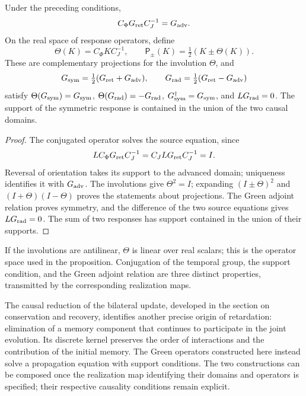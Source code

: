 \begin{proposition}
\label{vii:prop:green-paridades}
Under the preceding conditions,
\[
 C_\Phi G_{\rm ret}C_J^{-1}=G_{\rm adv}.
\]
On the real space of response operators, define
\[
 \Theta(K)=C_\Phi K C_J^{-1},\qquad
 \mathsf P_\pm(K)=\tfrac12(K\pm\Theta(K)).
\]
These are complementary projections for the involution \(\Theta\), and
\begin{equation}
 G_{\rm sym}=\tfrac12(G_{\rm ret}+G_{\rm adv}),\qquad
 G_{\rm rad}=\tfrac12(G_{\rm ret}-G_{\rm adv})
 \label{vii:eq:descomposicion-green}
\end{equation}
satisfy \(\Theta(G_{\rm sym})=G_{\rm sym}\),
\(\Theta(G_{\rm rad})=-G_{\rm rad}\),
\(G_{\rm sym}^{\dagger}=G_{\rm sym}\), and
\(LG_{\rm rad}=0\). The support of the symmetric response is contained
in the union of the two causal domains.
\end{proposition}
\begin{proof}
The conjugated operator solves the source equation, since
\[
 LC_\Phi G_{\rm ret}C_J^{-1}=C_JLG_{\rm ret}C_J^{-1}=I.
\]
Reversal of orientation takes its support to the advanced domain;
uniqueness identifies it with \(G_{\rm adv}\). The involutions give
\(\Theta^2=I\); expanding \((I\pm\Theta)^2\) and
\((I+\Theta)(I-\Theta)\) proves the statements about projections.
The Green adjoint relation proves symmetry, and the difference of the two
source equations gives \(LG_{\rm rad}=0\). The sum of two responses
has support contained in the union of their supports.
\end{proof}

If the involutions are antilinear, \(\Theta\) is linear over
real scalars; this is the operator space used in the proposition.
Conjugation of the temporal group, the support condition, and the
Green adjoint relation are three distinct properties, transmitted by the
corresponding realization maps.

The causal reduction of the bilateral update, developed in the section
on conservation and recovery, identifies another precise origin of
retardation: elimination of a memory component that continues to
participate in the joint evolution. Its discrete kernel preserves the
order of interactions and the contribution of the initial memory.
The Green operators constructed here instead solve a propagation
equation with support conditions. The two constructions can be composed
once the realization map identifying their domains and operators is
specified; their respective causality conditions remain explicit.

